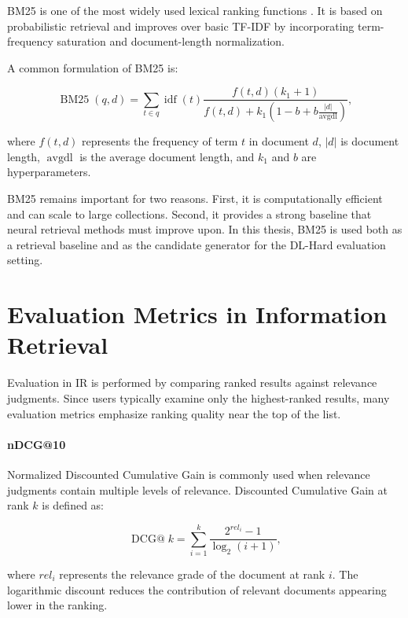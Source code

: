 BM25 is one of the most widely used lexical ranking functions \cite{robertson2009probabilistic}. It is based on probabilistic retrieval and improves over basic TF-IDF by incorporating term-frequency saturation and document-length normalization.

A common formulation of BM25 is:

\begin{equation}
    \operatorname{BM25}(q,d)
    =
    \sum_{t \in q}
    \operatorname{idf}(t)
    \frac{f(t,d)(k_1+1)}
    {f(t,d)+k_1\left(1-b+b\frac{|d|}{\operatorname{avgdl}}\right)},
\end{equation}

where $f(t,d)$ represents the frequency of term $t$ in document $d$, $|d|$ is document length, $\operatorname{avgdl}$ is the average document length, and $k_1$ and $b$ are hyperparameters.

BM25 remains important for two reasons. First, it is computationally efficient and can scale to large collections. Second, it provides a strong baseline that neural retrieval methods must improve upon. In this thesis, BM25 is used both as a retrieval baseline and as the candidate generator for the DL-Hard evaluation setting.

\section{Evaluation Metrics in Information Retrieval}
\label{sec:background_metrics}

Evaluation in IR is performed by comparing ranked results against relevance judgments. Since users typically examine only the highest-ranked results, many evaluation metrics emphasize ranking quality near the top of the list.

\paragraph{nDCG@10}
\label{subsec:background_nDCG}

Normalized Discounted Cumulative Gain is commonly used when relevance judgments contain multiple levels of relevance. Discounted Cumulative Gain at rank $k$ is defined as:

\begin{equation}
    \operatorname{DCG@}k =
    \sum_{i=1}^{k}
    \frac{2^{rel_i}-1}{\log_2(i+1)},
\end{equation}

where $rel_i$ represents the relevance grade of the document at rank $i$. The logarithmic discount reduces the contribution of relevant documents appearing lower in the ranking.


